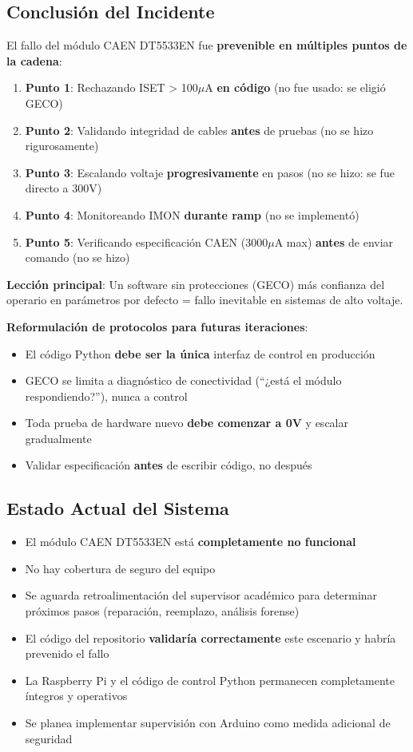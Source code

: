 \documentclass{article}
\begin{document}
\subsection{Conclusión del Incidente}

El fallo del módulo CAEN DT5533EN fue \textbf{prevenible en múltiples puntos de la cadena}:

\begin{enumerate}
    \item \textbf{Punto 1}: Rechazando ISET > 100\(\mu\)A \textbf{en código} (no fue usado: se eligió GECO)
    \item \textbf{Punto 2}: Validando integridad de cables \textbf{antes} de pruebas (no se hizo rigurosamente)
    \item \textbf{Punto 3}: Escalando voltaje \textbf{progresivamente} en pasos (no se hizo: se fue directo a 300V)
    \item \textbf{Punto 4}: Monitoreando IMON \textbf{durante ramp} (no se implementó)
    \item \textbf{Punto 5}: Verificando especificación CAEN (3000\(\mu\)A max) \textbf{antes} de enviar comando (no se hizo)
\end{enumerate}

\textbf{Lección principal}: Un software sin protecciones (GECO) más confianza del operario en parámetros por defecto = fallo inevitable en sistemas de alto voltaje.

\textbf{Reformulación de protocolos para futuras iteraciones}:
\begin{itemize}
    \item El código Python \textbf{debe ser la única} interfaz de control en producción
    \item GECO se limita a diagnóstico de conectividad (``¿está el módulo respondiendo?''), nunca a control
    \item Toda prueba de hardware nuevo \textbf{debe comenzar a 0V} y escalar gradualmente
    \item Validar especificación \textbf{antes} de escribir código, no después
\end{itemize}

\subsection{Estado Actual del Sistema}

\begin{itemize}
    \item El módulo CAEN DT5533EN está \textbf{completamente no funcional}
    \item No hay cobertura de seguro del equipo
    \item Se aguarda retroalimentación del supervisor académico para determinar próximos pasos (reparación, reemplazo, análisis forense)
    \item El código del repositorio \textbf{validaría correctamente} este escenario y habría prevenido el fallo
    \item La Raspberry Pi y el código de control Python permanecen completamente íntegros y operativos
    \item Se planea implementar supervisión con Arduino como medida adicional de seguridad
\end{itemize}
\end{document}
